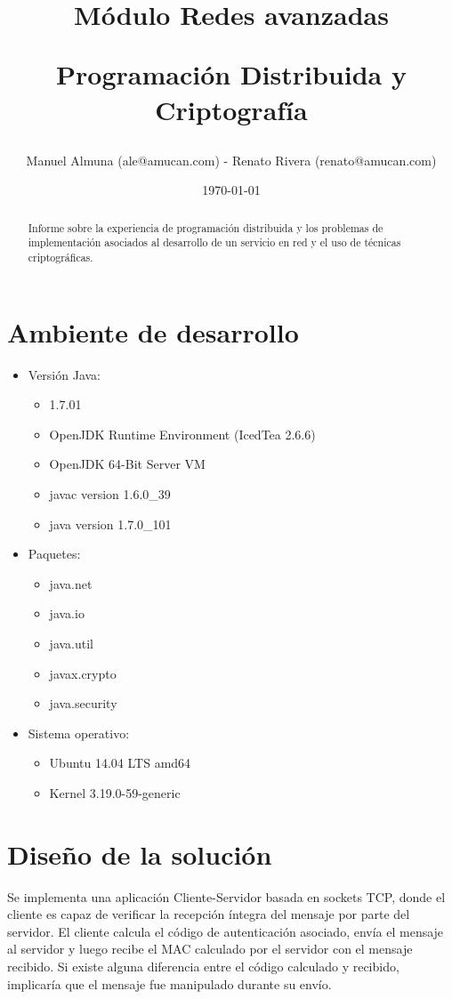 \documentclass[letter, 10pt]{article}
\begin{document}
\title{Módulo Redes avanzadas \\ \begin{Large}Programación Distribuida y Criptografía\end{Large}}
\author{Manuel Almuna (ale@amucan.com) - Renato Rivera (renato@amucan.com)}
\date{\today}
\maketitle

\begin{abstract}
Informe sobre la experiencia de programación distribuida y 	
los problemas de implementación asociados al desarrollo de un servicio en red y	el	
uso de técnicas criptográficas.

\end{abstract}
\section{Ambiente de desarrollo}
\begin{itemize}
  \item Versión Java: 
  \begin{itemize}
    \item 1.7.01
    \item OpenJDK Runtime Environment (IcedTea 2.6.6)
    \item OpenJDK 64-Bit Server VM
    \item javac version 1.6.0\_39
    \item java version 1.7.0\_101
  \end{itemize}
  \item Paquetes:
  \begin{itemize}
    \item java.net
    \item java.io
    \item java.util
    \item javax.crypto
    \item java.security
  \end{itemize} 
  \item Sistema operativo: 
  \begin{itemize}
    \item Ubuntu 14.04 LTS amd64 
    \item Kernel 3.19.0-59-generic
    \end{itemize}
\end{itemize}


\section{Diseño de la solución}
Se implementa una aplicación Cliente-Servidor basada en sockets TCP, donde el cliente es capaz de
verificar la recepción íntegra del mensaje por parte del servidor. El cliente calcula el código de
autenticación asociado, envía el mensaje al servidor y luego recibe el MAC calculado por
el servidor con el mensaje recibido. Si existe alguna diferencia entre el código calculado y recibido,
implicaría que el mensaje fue manipulado durante su envío.
\newline
\\
\end{document}
